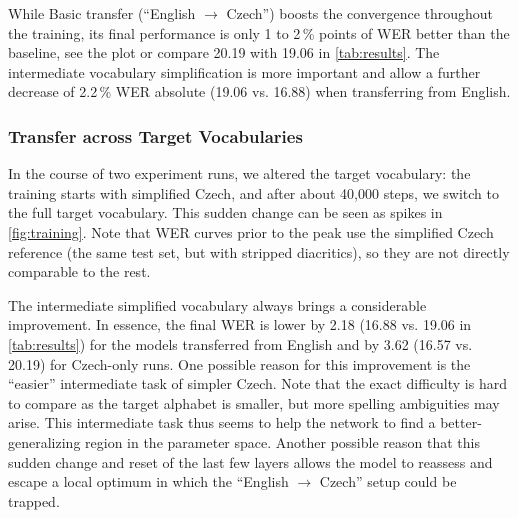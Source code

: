 % 
While Basic transfer (``English $\rightarrow$ Czech'') boosts the convergence
throughout the training, its final performance is only 1 to 2\,\% points of WER
better than the baseline, see the plot or compare 20.19 with 19.06 in
\cref{tab:results}. The intermediate vocabulary simplification is more important
and allow a further decrease of 2.2\,\% WER absolute (19.06 vs. 16.88) when transferring
from English.

\subsubsection{Transfer across Target Vocabularies}

In the course of two experiment runs, we altered the target vocabulary: the
training starts with simplified Czech, and after about 40,000 steps, we switch
to the full target vocabulary. This sudden change can be seen as spikes in
\cref{fig:training}. Note that WER curves prior to the peak use the simplified
Czech reference (the same test set, but with stripped diacritics), so they are
not directly comparable to the rest.

The intermediate simplified vocabulary always brings a considerable improvement. In essence, the final WER is lower by 2.18 (16.88 vs. 19.06 in \cref{tab:results}) for the models transferred from English and by 3.62 (16.57 vs. 20.19) for Czech-only runs.
One possible reason for this improvement is the ``easier'' intermediate task of
simpler Czech. Note that the exact difficulty is hard to compare as the target
alphabet is smaller, but more spelling ambiguities may arise. This intermediate
task thus seems to help the network to find a better-generalizing region in the parameter space. Another possible reason that this sudden change and reset of the last few layers allows the model to reassess and escape a local optimum in which the ``English $\rightarrow$ Czech'' setup could be trapped.


